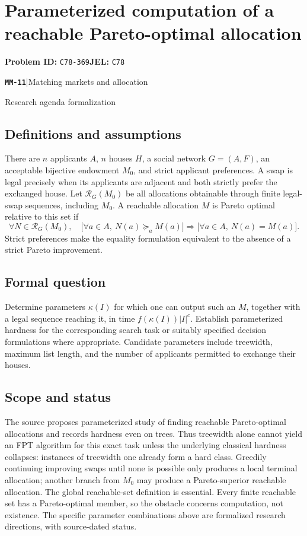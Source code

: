 \documentclass[11pt,a4paper]{article}
\newcommand{\entrymeta}[3]{{\sffamily\small\color{muted}\textbf{\texttt{#1}}\quad|\quad #2\par #3\par}}
\begin{document}
\section*{Parameterized computation of a reachable Pareto-optimal allocation}
\textbf{Problem ID:} \texttt{C78-369}\quad \textbf{JEL:} \texttt{C78}\par
\label{problem:OP-0552}
\label{beyond:MM-11}
\entrymeta{MM-11}{Matching markets and allocation}{Research agenda formalization}
\subsection*{Definitions and assumptions}
There are $n$ applicants $A$, $n$ houses $H$, a social network $G=(A,F)$, an acceptable bijective endowment $M_0$, and strict applicant preferences. A swap is legal precisely when its applicants are adjacent and both strictly prefer the exchanged house. Let $\mathcal R_G(M_0)$ be all allocations obtainable through finite legal-swap sequences, including $M_0$. A reachable allocation $M$ is Pareto optimal relative to this set if
\[
 \forall N\in\mathcal R_G(M_0),\quad
 \bigl[\forall a\in A,\ N(a)\succeq_a M(a)\bigr]
 \Longrightarrow \bigl[\forall a\in A,\ N(a)=M(a)\bigr].
\]
Strict preferences make the equality formulation equivalent to the absence of a strict Pareto improvement.
\subsection*{Formal question}
Determine parameters $\kappa(I)$ for which one can output such an $M$, together with a legal sequence reaching it, in time $f(\kappa(I))|I|^c$. Establish parameterized hardness for the corresponding search task or suitably specified decision formulations where appropriate. Candidate parameters include treewidth, maximum list length, and the number of applicants permitted to exchange their houses.
\subsection*{Scope and status}
The source proposes parameterized study of finding reachable Pareto-optimal allocations and records hardness even on trees. Thus treewidth alone cannot yield an FPT algorithm for this exact task unless the underlying classical hardness collapses: instances of treewidth one already form a hard class. Greedily continuing improving swaps until none is possible only produces a local terminal allocation; another branch from $M_0$ may produce a Pareto-superior reachable allocation. The global reachable-set definition is essential. Every finite reachable set has a Pareto-optimal member, so the obstacle concerns computation, not existence. The specific parameter combinations above are formalized research directions, with source-dated status.
\end{document}
